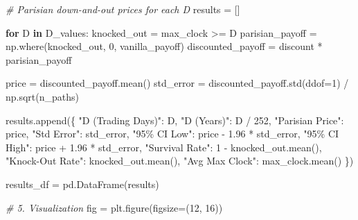 \documentclass[
  11pt,
]{article}
\newenvironment{Shaded}{}{}
\newcommand{\CommentTok}[1]{\textcolor[rgb]{0.38,0.63,0.69}{\textit{#1}}}
\newcommand{\ControlFlowTok}[1]{\textcolor[rgb]{0.00,0.44,0.13}{\textbf{#1}}}
\newcommand{\DecValTok}[1]{\textcolor[rgb]{0.25,0.63,0.44}{#1}}
\newcommand{\FloatTok}[1]{\textcolor[rgb]{0.25,0.63,0.44}{#1}}
\newcommand{\KeywordTok}[1]{\textcolor[rgb]{0.00,0.44,0.13}{\textbf{#1}}}
\newcommand{\NormalTok}[1]{#1}
\newcommand{\OperatorTok}[1]{\textcolor[rgb]{0.40,0.40,0.40}{#1}}
\newcommand{\StringTok}[1]{\textcolor[rgb]{0.25,0.44,0.63}{#1}}
\begin{document}
\begin{Shaded}
\begin{Highlighting}[]
\CommentTok{\# Parisian down{-}and{-}out prices for each D}
\NormalTok{results }\OperatorTok{=}\NormalTok{ []}

\ControlFlowTok{for}\NormalTok{ D }\KeywordTok{in}\NormalTok{ D\_values:}
\NormalTok{    knocked\_out }\OperatorTok{=}\NormalTok{ max\_clock }\OperatorTok{\textgreater{}=}\NormalTok{ D}
\NormalTok{    parisian\_payoff }\OperatorTok{=}\NormalTok{ np.where(knocked\_out, }\DecValTok{0}\NormalTok{, vanilla\_payoff)}
\NormalTok{    discounted\_payoff }\OperatorTok{=}\NormalTok{ discount }\OperatorTok{*}\NormalTok{ parisian\_payoff}

\NormalTok{    price }\OperatorTok{=}\NormalTok{ discounted\_payoff.mean()}
\NormalTok{    std\_error }\OperatorTok{=}\NormalTok{ discounted\_payoff.std(ddof}\OperatorTok{=}\DecValTok{1}\NormalTok{) }\OperatorTok{/}\NormalTok{ np.sqrt(n\_paths)}

\NormalTok{    results.append(\{}
        \StringTok{"D (Trading Days)"}\NormalTok{: D,}
        \StringTok{"D (Years)"}\NormalTok{: D }\OperatorTok{/} \DecValTok{252}\NormalTok{,}
        \StringTok{"Parisian Price"}\NormalTok{: price,}
        \StringTok{"Std Error"}\NormalTok{: std\_error,}
        \StringTok{"95\% CI Low"}\NormalTok{: price }\OperatorTok{{-}} \FloatTok{1.96} \OperatorTok{*}\NormalTok{ std\_error,}
        \StringTok{"95\% CI High"}\NormalTok{: price }\OperatorTok{+} \FloatTok{1.96} \OperatorTok{*}\NormalTok{ std\_error,}
        \StringTok{"Survival Rate"}\NormalTok{: }\DecValTok{1} \OperatorTok{{-}}\NormalTok{ knocked\_out.mean(),}
        \StringTok{"Knock{-}Out Rate"}\NormalTok{: knocked\_out.mean(),}
        \StringTok{"Avg Max Clock"}\NormalTok{: max\_clock.mean()}
\NormalTok{    \})}

\NormalTok{results\_df }\OperatorTok{=}\NormalTok{ pd.DataFrame(results)}

\CommentTok{\# 5. Visualization}
\NormalTok{fig }\OperatorTok{=}\NormalTok{ plt.figure(figsize}\OperatorTok{=}\NormalTok{(}\DecValTok{12}\NormalTok{, }\DecValTok{16}\NormalTok{))}


\end{Highlighting}
\end{Shaded}
\end{document}
